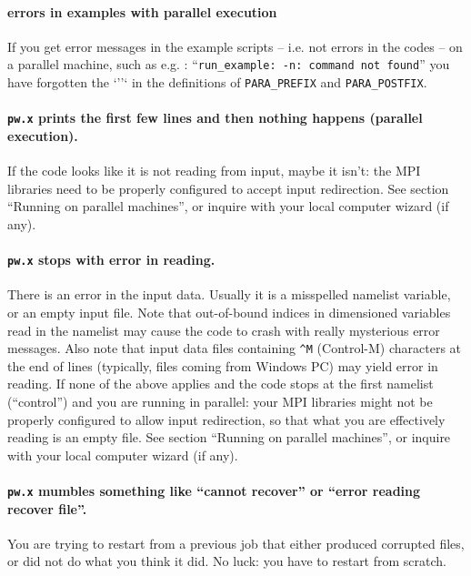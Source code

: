 \documentclass[12pt,a4paper]{article}
\begin{document}
\paragraph{errors in examples with parallel execution}

If you get error messages in the example scripts -- i.e. not errors
in the codes -- on a parallel  machine, such as e.g. :
``\texttt{run\_example: -n: command not found}''
you have forgotten the `''` in the definitions of 
\texttt{PARA\_PREFIX} and \texttt{PARA\_POSTFIX}.

\paragraph{\texttt{pw.x} prints the first few lines and then nothing
happens (parallel execution).}

If the code looks like it is not reading from input, maybe it isn't:
the MPI libraries need to be properly configured to accept input 
redirection. See section ``Running on parallel machines'', or inquire 
with your local computer wizard (if any).

\paragraph{\texttt{pw.x} stops with error in reading.}

There is an error in the input data.
Usually it is a misspelled namelist variable, or an empty input file.
Note that out-of-bound indices in dimensioned variables read in the
namelist may cause the code to crash with really mysterious error
messages.
Also note that input data files containing \texttt{\^{}M} (Control-M)
characters at the end of lines (typically, files coming from Windows
PC) may yield error in reading.
If none of the above applies and the code stops at the first namelist
(``control'') and you are running in parallel: your MPI libraries
might not be properly configured to allow input redirection, so that 
what you are effectively reading is an empty file.
See section ``Running on parallel machines'', or inquire with your 
local computer wizard (if any).

\paragraph{\texttt{pw.x} mumbles something like ``cannot recover'' or
           ``error reading recover file''.}

You are trying to restart from a previous job that either produced 
corrupted files, or did not do what you think it did. No luck:
you have to restart from scratch.
\end{document}
